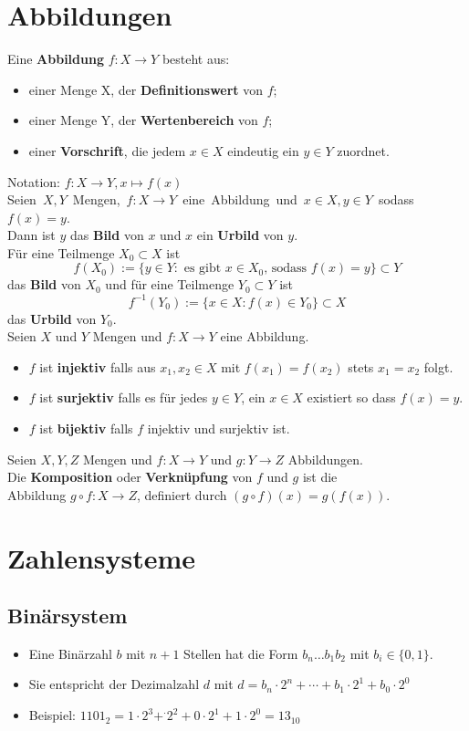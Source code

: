 \documentclass[12pt]{article}
\begin{document}
\newpage
\section{Abbildungen}
Eine \textbf{Abbildung} $f: X \to Y$ besteht aus:
\begin{itemize}
    \item einer Menge X, der \textbf{Definitionswert} von $f$;
    \item einer Menge Y, der \textbf{Wertenbereich} von $f$;
    \item einer \textbf{Vorschrift}, die jedem $x \in X$ eindeutig ein $y \in Y$ zuordnet.
\end{itemize}
Notation: $f: X \to Y, x \mapsto f(x)$ \\ 
\newline
\hbox{Seien $X, Y$ Mengen, $f: X \to Y$ eine Abbildung und $x \in X, y \in Y$ sodass $f(x)=y$.} \\
Dann ist $y$ das \textbf{Bild} von $x$ und $x$ ein \textbf{Urbild} von $y$.\\
Für eine Teilmenge $X_0 \subset X$ ist
\[f(X_0) := \{y \in Y: \text{ es gibt } x \in X_0 \text{, sodass } f(x)=y\} \subset Y\]
das \textbf{Bild} von $X_0$ und für eine Teilmenge $Y_0 \subset Y$ ist
\[f^{-1}(Y_0) := \{x \in X : f(x) \in Y_0\} \subset X\]
das \textbf{Urbild} von $Y_0$. \\ 
\newline
Seien $X$ und $Y$ Mengen und $f: X \to Y$ eine Abbildung.
\begin{itemize}
    \item[] $f$ ist \textbf{injektiv} falls aus $x_1,x_2 \in X$ mit $f(x_1) = f(x_2)$ stets $x_1 = x_2$ folgt.
    \item[] $f$ ist \textbf{surjektiv} falls es für jedes $y \in Y$, ein $x \in X$ existiert so dass $f(x) = y$.
    \item[] $f$ ist \textbf{bijektiv} falls $f$ injektiv und surjektiv ist.
\end{itemize}
Seien $X, Y, Z$ Mengen und $f: X \to Y$ und $g: Y \to Z$ Abbildungen.\\
Die \textbf{Komposition} oder \textbf{Verknüpfung} von $f$ und $g$ ist die\\
Abbildung $g \circ f: X \to Z$, definiert durch $(g \circ f)(x)=g(f(x))$.

\section{Zahlensysteme}
\subsection{Binärsystem}
\begin{itemize}[leftmargin=*]
    \item[] Eine Binärzahl $b$ mit $n + 1$ Stellen hat die Form $b_n\dots b_1 b_2$ mit $b_i \in \{0,1\}$.
    \item[] Sie entspricht der Dezimalzahl $d$ mit $d = b_n \cdot 2^n + \cdots + b_1 \cdot 2^1 + b_0 \cdot 2^0$ 
    \item[] Beispiel: $1101_2 = 1 \cdot 2^3 + ^\cdot 2^2 + 0 \cdot 2^1 + 1 \cdot 2^0 = 13_{10}$
\end{itemize}
\end{document}
